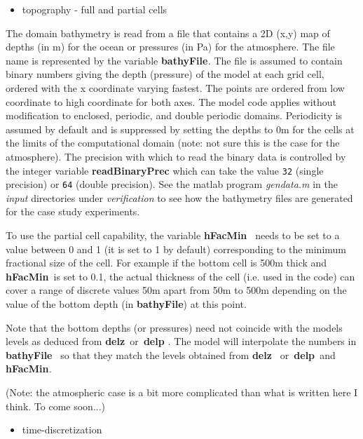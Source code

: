 \begin{itemize}
\item topography - full and partial cells
\end{itemize}

The domain bathymetry is read from a file that contains a 2D (x,y) map of
depths (in m) for the ocean or pressures (in Pa) for the atmosphere. The
file name is represented by the variable \textbf{bathyFile}\textit{. }The
file is assumed to contain binary numbers giving the depth (pressure) of the
model at each grid cell, ordered with the x coordinate varying fastest. The
points are ordered from low coordinate to high coordinate for both axes. The
model code applies without modification to enclosed, periodic, and double
periodic domains. Periodicity is assumed by default and is suppressed by
setting the depths to 0m for the cells at the limits of the computational
domain (note: not sure this is the case for the atmosphere). The precision
with which to read the binary data is controlled by the integer variable 
\textbf{readBinaryPrec }which can take the value \texttt{32} (single
precision) or \texttt{64} (double precision). See the matlab program \textit{%
gendata.m }in the \textit{input }directories under \textit{verification }to
see how the bathymetry files are generated for the case study experiments.

To use the partial cell capability, the variable \textbf{hFacMin}\textit{\ }%
needs to be set to a value between 0 and 1 (it is set to 1 by default)
corresponding to the minimum fractional size of the cell. For example if the
bottom cell is 500m thick and \textbf{hFacMin}\textit{\ }is set to 0.1, the
actual thickness of the cell (i.e. used in the code) can cover a range of
discrete values 50m apart from 50m to 500m depending on the value of the
bottom depth (in \textbf{bathyFile}) at this point.

Note that the bottom depths (or pressures) need not coincide with the models
levels as deduced from \textbf{delz}\textit{\ }or\textit{\ }\textbf{delp}%
\textit{. }The model will interpolate the numbers in \textbf{bathyFile}%
\textit{\ }so that they match the levels obtained from \textbf{delz}\textit{%
\ }or\textit{\ }\textbf{delp}\textit{\ }and \textbf{hFacMin}\textit{. }

(Note: the atmospheric case is a bit more complicated than what is written
here I think. To come soon...)

\begin{itemize}
\item time-discretization
\end{itemize}

